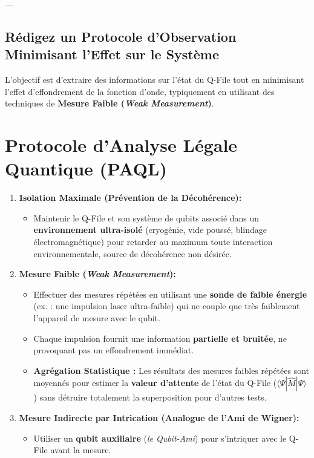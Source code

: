 \documentclass[12pt,a4paper]{report}
\begin{document}
---

\subsection*{Rédigez un Protocole d'Observation Minimisant l'Effet sur le Système}

L'objectif est d'extraire des informations sur l'état du Q-File tout en minimisant l'effet d'effondrement de la fonction d'onde, typiquement en utilisant des techniques de \textbf{Mesure Faible (\textit{Weak Measurement})}.
\section*{Protocole d'Analyse Légale Quantique (PAQL)}

\begin{enumerate}
	\item \textbf{Isolation Maximale (Prévention de la Décohérence):}
	\begin{itemize}
		\item Maintenir le Q-File et son système de qubits associé dans un \textbf{environnement ultra-isolé} (cryogénie, vide poussé, blindage électromagnétique) pour retarder au maximum toute interaction environnementale, source de décohérence non désirée.
	\end{itemize}
	\item \textbf{Mesure Faible (\textit{Weak Measurement}):}
	\begin{itemize}
		\item Effectuer des mesures répétées en utilisant une \textbf{sonde de faible énergie} (ex. : une impulsion laser ultra-faible) qui ne couple que très faiblement l'appareil de mesure avec le qubit.
		\item Chaque impulsion fournit une information \textbf{partielle et bruitée}, ne provoquant pas un effondrement immédiat.
		\item \textbf{Agrégation Statistique :} Les résultats des mesures faibles répétées sont moyennés pour estimer la \textbf{valeur d'attente} de l'état du Q-File ($ \langle \Psi | \hat{M} | \Psi \rangle $) sans détruire totalement la superposition pour d'autres tests.
	\end{itemize}
	\item \textbf{Mesure Indirecte par Intrication (Analogue de l'Ami de Wigner):}
	\begin{itemize}
		\item Utiliser un \textbf{qubit auxiliaire} (\emph{le Qubit-Ami}) pour s'intriquer avec le Q-File avant la mesure.

\end{itemize}
\end{enumerate}
\end{document}
